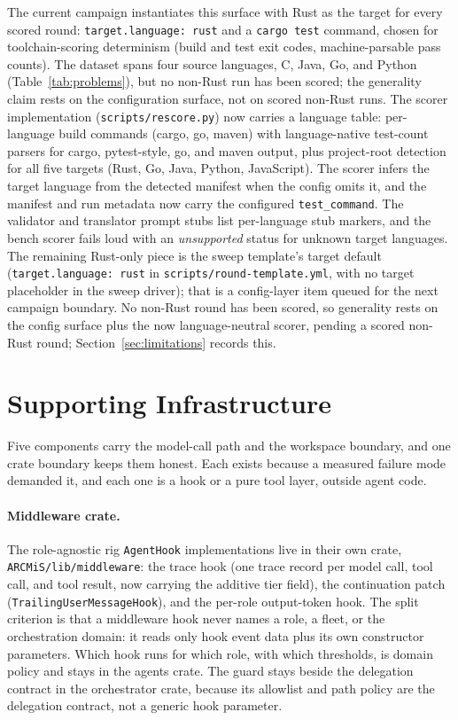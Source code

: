 \documentclass[11pt]{article}
\begin{document}
The current campaign instantiates this surface with Rust as the target
for every scored round: \texttt{target.language: rust} and a
\texttt{cargo test} command, chosen for toolchain-scoring determinism
(build and test exit codes, machine-parsable pass counts). The dataset
spans four source languages, C, Java, Go, and Python
(Table~\ref{tab:problems}), but no non-Rust run has been scored; the
generality claim rests on the configuration surface, not on scored
non-Rust runs. The scorer implementation
(\texttt{scripts/rescore.py}) now carries a language table: per-language
build commands (cargo, go, maven) with language-native test-count
parsers for cargo, pytest-style, go, and maven output, plus project-root
detection for all five targets (Rust, Go, Java, Python, JavaScript). The
scorer infers the target language from the detected manifest when the
config omits it, and the manifest and run metadata now carry the
configured \texttt{test\_command}. The validator and translator prompt
stubs list per-language stub markers, and the bench scorer fails loud
with an \emph{unsupported} status for unknown target languages. The
remaining Rust-only piece is the sweep template's target default
(\texttt{target.language: rust} in \texttt{scripts/round-template.yml},
with no target placeholder in the sweep driver); that is a config-layer
item queued for the next campaign boundary. No non-Rust round has been
scored, so generality rests on the config surface plus the now
language-neutral scorer, pending a scored non-Rust round;
Section~\ref{sec:limitations} records this.

\section{Supporting Infrastructure}
\label{sec:infra}

Five components carry the model-call path and the workspace boundary,
and one crate boundary keeps them honest. Each exists because a measured
failure mode demanded it, and each one is a hook or a pure tool layer,
outside agent code.

\paragraph{Middleware crate.}
The role-agnostic rig \texttt{AgentHook} implementations live in their
own crate, \texttt{ARCMiS/lib/middleware}: the trace hook (one trace
record per model call, tool call, and tool result, now carrying the
additive tier field), the continuation patch
(\texttt{TrailingUserMessageHook}), and the per-role output-token hook.
The split criterion is that a middleware hook never names a role, a
fleet, or the orchestration domain: it reads only hook event data plus
its own constructor parameters. Which hook runs for which role, with
which thresholds, is domain policy and stays in the agents crate. The
guard stays beside the delegation contract in the orchestrator crate,
because its allowlist and path policy are the delegation contract, not a
generic hook parameter.
\end{document}
